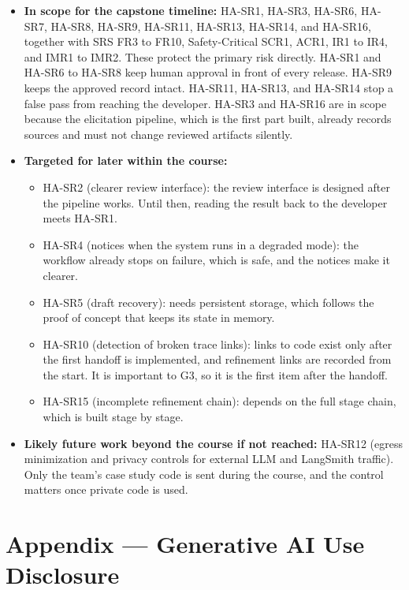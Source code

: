 \documentclass{article}
\begin{document}
\begin{itemize}
  \item \textbf{In scope for the capstone timeline:} HA-SR1, HA-SR3, HA-SR6,
  HA-SR7, HA-SR8, HA-SR9, HA-SR11, HA-SR13, HA-SR14, and HA-SR16, together with
  SRS FR3 to FR10, Safety-Critical SCR1, ACR1, IR1 to IR4, and IMR1 to IMR2.
  These protect the primary risk directly. HA-SR1 and HA-SR6 to HA-SR8 keep
  human approval in front of every release. HA-SR9 keeps the approved record
  intact. HA-SR11, HA-SR13, and HA-SR14 stop a false pass from reaching the
  developer.
  HA-SR3 and HA-SR16 are in scope because the elicitation pipeline, which is the
  first part built, already records sources and must not change reviewed
  artifacts silently.
  \item \textbf{Targeted for later within the course:}
  \begin{itemize}
    \item HA-SR2 (clearer review interface): the review interface is designed
    after the pipeline works. Until then, reading the result back to the
    developer meets HA-SR1.
    \item HA-SR4 (notices when the system runs in a degraded mode): the
    workflow already stops on failure, which is safe, and the notices make it
    clearer.
    \item HA-SR5 (draft recovery): needs persistent storage, which follows the
    proof of concept that keeps its state in memory.
    \item HA-SR10 (detection of broken trace links): links to code exist only
    after the first handoff is implemented, and refinement links are recorded
    from the start. It is important to G3, so it is the first item after the handoff.
    \item HA-SR15 (incomplete refinement chain): depends on the full stage
    chain, which is built stage by stage.
  \end{itemize}
  \item \textbf{Likely future work beyond the course if not reached:}
  HA-SR12 (egress minimization and privacy controls for external LLM and
  LangSmith traffic). Only the team's case study code is sent during the course,
  and the control matters once private code is used.
\end{itemize}

\newpage{}

\section{Appendix --- Generative AI Use Disclosure}
\end{document}
